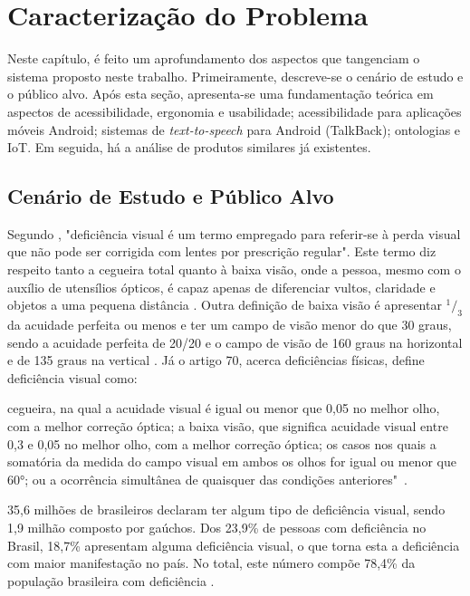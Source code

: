 \chapter{\label{chap:caract}Caracterização do Problema}

Neste capítulo, é feito um aprofundamento dos aspectos que tangenciam o sistema proposto neste trabalho. Primeiramente, descreve-se o cenário de estudo e o público alvo. Após esta seção, apresenta-se uma fundamentação teórica em aspectos de acessibilidade, ergonomia e usabilidade; acessibilidade para aplicações móveis Android; sistemas de \emph{text-to-speech} para Android (TalkBack); ontologias e IoT. Em seguida, há a análise de produtos similares já existentes.

\section{Cenário de Estudo e Público Alvo}

Segundo \cite{MOURA2006}, "deficiência visual é um termo empregado para referir-se à perda visual que não pode ser corrigida com lentes por prescrição regular". Este termo diz respeito tanto a cegueira total quanto à baixa visão, onde a pessoa, mesmo com o auxílio de utensílios ópticos, é capaz apenas de diferenciar vultos, claridade e objetos a uma pequena distância \cite{TVESCOLA}. Outra definição de baixa visão é apresentar $^1/_3$ da acuidade perfeita ou menos e ter um campo de visão menor do que 30 graus, sendo a acuidade perfeita de 20/20 e o campo de visão de 160 graus na horizontal e de 135 graus na vertical \cite{ERGO2015}. Já o artigo 70, acerca deficiências físicas, define deficiência visual como:
\begin{directcite}
	cegueira, na qual a acuidade visual é igual ou menor que 0,05 no melhor olho, com a melhor correção óptica; a baixa visão, que significa acuidade visual entre 0,3 e 0,05 no melhor olho, com a melhor correção óptica; os casos nos quais a somatória da medida do campo visual em ambos os olhos for igual ou menor que 60°; ou a ocorrência simultânea de quaisquer das condições anteriores"\ \cite{D5296}.
\end{directcite}

35,6 milhões de brasileiros declaram ter algum tipo de deficiência visual, sendo 1,9 milhão composto por gaúchos. Dos 23,9\% de pessoas com deficiência no Brasil, 18,7\% apresentam alguma deficiência visual, o que torna esta a deficiência com maior manifestação no país. No total, este número compõe 78,4\% da população brasileira com deficiência \cite{IBGE2010}.

